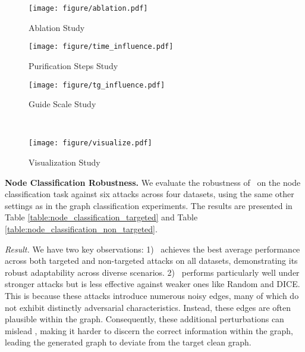 \begin{figure*}[!t]
    \begin{minipage}{0.33\textwidth}
        \centering
        \texttt{[image: figure/ablation.pdf]}
    \vspace{-2.5em}
        
        \caption{Ablation Study}
        \label{fig_ablation}
    \end{minipage} 
    \begin{minipage}{0.33\textwidth}
    \centering
    \texttt{[image: figure/time\_influence.pdf]}
    \vspace{-2.5em}
    
    \caption{Purification Steps Study}
    \label{fig_diffusion_steps}
\end{minipage}
\begin{minipage}{0.33\textwidth}
    \centering
    \texttt{[image: figure/tg\_influence.pdf]}
    \vspace{-2.5em}
    
    \caption{Guide Scale Study}
    \label{fig_graph_transfer_entropy}
\end{minipage}\\
\begin{minipage}{1.0\textwidth}
    \centering
    \texttt{[image: figure/visualize.pdf]}
    \vspace{-2.5em}
    \caption{Visualization Study}
    \label{fig_visualization}
    \vspace{-1em}
\end{minipage}
\end{figure*}

\noindent\textbf{Node Classification Robustness.}
We evaluate the robustness of \ModelName\ on the node classification task against six attacks across four datasets, using the same other settings as in the graph classification experiments. The results are presented in Table \ref{table:node_classification_targeted} and Table \ref{table:node_classification_non_targeted}.

\textit{Result.} We have two key observations: 
1) \ModelName\ achieves the best average performance across both targeted and non-targeted attacks on all datasets, demonstrating its robust adaptability across diverse scenarios. 
2) \ModelName\ performs particularly well under stronger attacks but is less effective against weaker ones like Random and DICE. This is because these attacks introduce numerous noisy edges, many of which do not exhibit distinctly adversarial characteristics. Instead, these edges are often plausible within the graph. Consequently, these additional perturbations can mislead \ModelName, making it harder to discern the correct information within the graph, leading the generated graph to deviate from the target clean graph.


